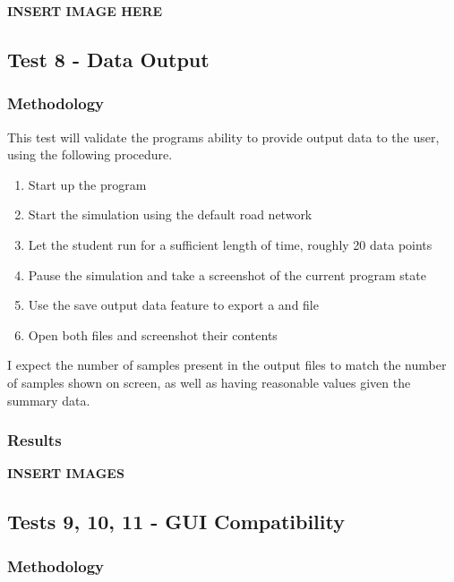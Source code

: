            \textbf{INSERT IMAGE HERE}

    \subsection{Test 8 - Data Output}

        \subsubsection{Methodology}

            This test will validate the programs ability to provide output data to the user, using the following procedure.

            \begin{enumerate}
                \item Start up the program
                \item Start the simulation using the default road network
                \item Let the student run for a sufficient length of time, roughly 20 data points
                \item Pause the simulation and take a screenshot of the current program state
                \item Use the save output data feature to export a  and  file
                \item Open both files and screenshot their contents
            \end{enumerate}

            I expect the number of samples present in the output files to match the number of samples shown on screen, as well as having reasonable values given the summary data.

        \subsubsection{Results}

            \textbf{INSERT IMAGES}

    \subsection{Tests 9, 10, 11 - GUI Compatibility}

        \subsubsection{Methodology}

